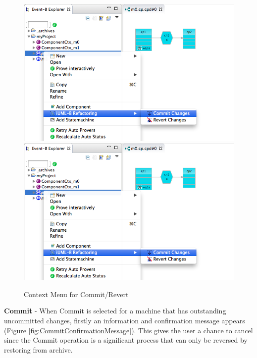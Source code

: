  \begin{figure}[!htbp]
  \centering
  \ifplastex
  \includegraphics[width=1024]{figures/image61.png}
  \else
  \includegraphics[width=1\textwidth]{figures/image61.png}
  \fi
  \caption{Context Menu for Commit/Revert}
  \label{fig:ContextMenuForCommitRevert}
\end{figure} 

\textbf{Commit} -
When Commit is selected for a machine that has outstanding uncommitted changes, firstly an information and confirmation message appears (Figure \ref{fig:CommitConfirmationMessage}). This gives the user a chance to cancel since the Commit operation is a significant process that can only be reversed by restoring from archive.

